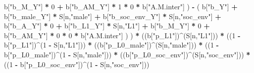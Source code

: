 \documentclass[
]{book}
\newenvironment{Shaded}{\begin{snugshade}}{\end{snugshade}}
\newcommand{\DecValTok}[1]{\textcolor[rgb]{0.00,0.00,0.81}{#1}}
\newcommand{\NormalTok}[1]{#1}
\newcommand{\SpecialCharTok}[1]{\textcolor[rgb]{0.81,0.36,0.00}{\textbf{#1}}}
\newcommand{\StringTok}[1]{\textcolor[rgb]{0.31,0.60,0.02}{#1}}
\begin{document}
\begin{Shaded}
\begin{Highlighting}[]
\NormalTok{                            b[}\StringTok{"b\_M\_Y"}\NormalTok{] }\SpecialCharTok{*} \DecValTok{0} \SpecialCharTok{+}
\NormalTok{                            b[}\StringTok{"b\_AM\_Y"}\NormalTok{] }\SpecialCharTok{*} \DecValTok{1} \SpecialCharTok{*} \DecValTok{0} \SpecialCharTok{*}\NormalTok{ b[}\StringTok{"A.M.inter"}\NormalTok{] ) }\SpecialCharTok{{-}} 
\NormalTok{                          ( b[}\StringTok{"b\_Y"}\NormalTok{] }\SpecialCharTok{+} 
\NormalTok{                              b[}\StringTok{"b\_male\_Y"}\NormalTok{] }\SpecialCharTok{*}\NormalTok{ S[n,}\StringTok{"male"}\NormalTok{] }\SpecialCharTok{+} 
\NormalTok{                              b[}\StringTok{"b\_soc\_env\_Y"}\NormalTok{] }\SpecialCharTok{*}\NormalTok{ S[n,}\StringTok{"soc\_env"}\NormalTok{] }\SpecialCharTok{+} 
\NormalTok{                              b[}\StringTok{"b\_A\_Y"}\NormalTok{] }\SpecialCharTok{*} \DecValTok{0} \SpecialCharTok{+} 
\NormalTok{                              b[}\StringTok{"b\_L1\_Y"}\NormalTok{] }\SpecialCharTok{*}\NormalTok{ S[n,}\StringTok{"L1"}\NormalTok{] }\SpecialCharTok{+}
\NormalTok{                              b[}\StringTok{"b\_M\_Y"}\NormalTok{] }\SpecialCharTok{*} \DecValTok{0} \SpecialCharTok{+}
\NormalTok{                              b[}\StringTok{"b\_AM\_Y"}\NormalTok{] }\SpecialCharTok{*} \DecValTok{0} \SpecialCharTok{*} \DecValTok{0} \SpecialCharTok{*}\NormalTok{ b[}\StringTok{"A.M.inter"}\NormalTok{] ) ) }\SpecialCharTok{*}
\NormalTok{      ((b[}\StringTok{"p\_L1"}\NormalTok{])}\SpecialCharTok{\^{}}\NormalTok{(S[n,}\StringTok{"L1"}\NormalTok{])) }\SpecialCharTok{*}
\NormalTok{      ((}\DecValTok{1} \SpecialCharTok{{-}}\NormalTok{ b[}\StringTok{"p\_L1"}\NormalTok{])}\SpecialCharTok{\^{}}\NormalTok{(}\DecValTok{1} \SpecialCharTok{{-}}\NormalTok{ S[n,}\StringTok{"L1"}\NormalTok{])) }\SpecialCharTok{*}
\NormalTok{      ((b[}\StringTok{"p\_L0\_male"}\NormalTok{])}\SpecialCharTok{\^{}}\NormalTok{(S[n,}\StringTok{"male"}\NormalTok{])) }\SpecialCharTok{*} 
\NormalTok{      ((}\DecValTok{1} \SpecialCharTok{{-}}\NormalTok{ b[}\StringTok{"p\_L0\_male"}\NormalTok{])}\SpecialCharTok{\^{}}\NormalTok{(}\DecValTok{1} \SpecialCharTok{{-}}\NormalTok{ S[n,}\StringTok{"male"}\NormalTok{])) }\SpecialCharTok{*} 
\NormalTok{      ((b[}\StringTok{"p\_L0\_soc\_env"}\NormalTok{])}\SpecialCharTok{\^{}}\NormalTok{(S[n,}\StringTok{"soc\_env"}\NormalTok{])) }\SpecialCharTok{*}
\NormalTok{      ((}\DecValTok{1} \SpecialCharTok{{-}}\NormalTok{ b[}\StringTok{"p\_L0\_soc\_env"}\NormalTok{])}\SpecialCharTok{\^{}}\NormalTok{(}\DecValTok{1} \SpecialCharTok{{-}}\NormalTok{ S[n,}\StringTok{"soc\_env"}\NormalTok{])) }
    

\end{Highlighting}
\end{Shaded}
\end{document}

